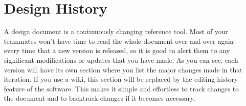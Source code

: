 \chapter{Design History}
A design document is a continuously changing reference tool. Most of your teammates won't have time to read the whole document over and over again every time that a new version is released, so it is good to alert them to any significant modifications or updates that you have made. As you can see, each version will have its own section where you list the major changes made in that iteration. If you use a wiki, this section will be replaced by the editing history feature of the software. This makes it simple and effortless to track changes to the document and to backtrack changes if it becomes necessary.

